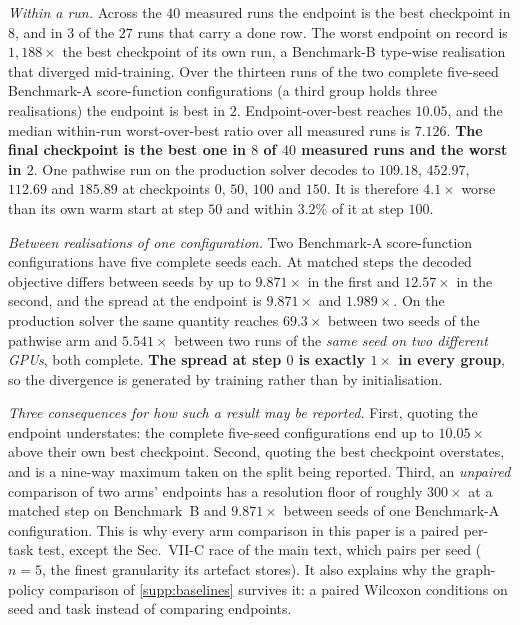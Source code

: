 \emph{Within a run.}  Across the $40$ measured runs the endpoint is the best
checkpoint in $8$, and in $3$ of the $27$ runs that carry a done row.  The worst
endpoint on record is $1{,}188\times$ the best checkpoint of its own run, a
Benchmark-B type-wise realisation that diverged mid-training.  Over the thirteen runs
of the two complete five-seed Benchmark-A score-function configurations (a third
group holds three realisations) the endpoint is best in $2$. Endpoint-over-best reaches $10.05$, and the median within-run worst-over-best
ratio over all measured runs is $7.126$.  \textbf{The final
checkpoint is the best one in $8$ of $40$ measured runs and the worst in $2$}.  One pathwise run on the production solver decodes to $109.18$, $452.97$,
$112.69$ and $185.89$ at checkpoints $0$, $50$, $100$ and $150$.  It is therefore
$4.1\times$ worse than its own warm start at step $50$ and within $3.2\%$ of it at
step $100$.

\emph{Between realisations of one configuration.} Two Benchmark-A score-function configurations have five
complete seeds each. At matched steps the decoded objective differs between seeds by up to
\textbf{$9.871\times$} in the first and \textbf{$12.57\times$} in the second, and the spread at the
endpoint is $9.871\times$ and $1.989\times$. On the production solver the same quantity reaches
$69.3\times$ between two seeds of the pathwise arm and $5.541\times$ between two runs of the
\emph{same seed on two different GPUs}, both complete. \textbf{The spread at step $0$ is exactly $1\times$
in every group}, so the divergence is generated by training rather than by initialisation.

\emph{Three consequences for how such a result may be reported.} First, quoting the endpoint understates:
the complete five-seed configurations end up to $10.05\times$ above their own best checkpoint. Second, quoting the best
checkpoint overstates, and is a nine-way maximum taken on the split being reported. Third, an
\emph{unpaired} comparison of two arms' endpoints has a resolution floor of roughly
$300\times$ at a matched step on Benchmark~B and $9.871\times$ between seeds of one
Benchmark-A configuration. This is why every arm comparison in this paper is a paired
per-task test, except the Sec.~VII-C race of the main text, which pairs per seed ($n=5$, the
finest granularity its artefact stores). It also explains why the graph-policy comparison of
\cref{supp:baselines} survives it: a paired Wilcoxon
conditions on seed and task instead of comparing endpoints.

